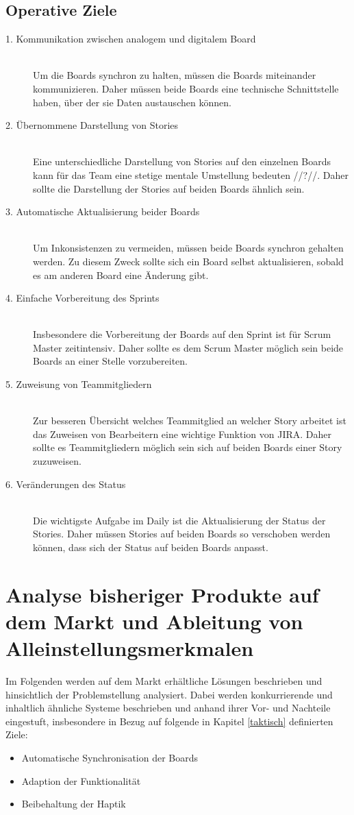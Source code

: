 \documentclass[12pt,titlepage]{scrartcl}
\begin{document}
		\subsection{Operative Ziele} \label{operativeZiele}
		\begin{description}
 			\item[1. Kommunikation zwischen analogem und digitalem Board] \hfill \\
 			Um die Boards synchron zu halten, müssen die Boards miteinander kommunizieren. Daher müssen beide Boards eine technische Schnittstelle haben, über der sie Daten austauschen können. 
 			\item[2. Übernommene Darstellung von Stories] \hfill \\
 			Eine unterschiedliche Darstellung von Stories auf den einzelnen Boards kann für das Team eine stetige mentale Umstellung bedeuten //?//. Daher sollte die Darstellung der Stories auf beiden Boards ähnlich sein.
 			\item[3. Automatische Aktualisierung beider Boards] \hfill \\
 			Um Inkonsistenzen zu vermeiden, müssen beide Boards synchron gehalten werden. Zu diesem Zweck sollte sich ein Board selbst aktualisieren, sobald es am anderen Board eine Änderung gibt.
 			\item[4. Einfache Vorbereitung des Sprints] \hfill \\
 			Insbesondere die Vorbereitung der Boards auf den Sprint ist für Scrum Master zeitintensiv. Daher sollte es dem Scrum Master möglich sein beide Boards an einer Stelle vorzubereiten.
 			\item[5. Zuweisung von Teammitgliedern] \hfill \\
 			Zur besseren Übersicht welches Teammitglied an welcher Story arbeitet ist das Zuweisen von Bearbeitern eine wichtige Funktion von JIRA. Daher sollte es Teammitgliedern möglich sein sich auf beiden Boards einer Story zuzuweisen.
 			\item[6. Veränderungen des Status] \hfill \\
 			Die wichtigste Aufgabe im Daily ist die Aktualisierung der Status der Stories. Daher müssen Stories auf beiden Boards so verschoben werden können, dass sich der Status auf beiden Boards anpasst.
		\end{description}
	\newpage	
	\section{Analyse bisheriger Produkte auf dem Markt und Ableitung von Alleinstellungsmerkmalen} \label{markt}
	Im Folgenden werden auf dem Markt erhältliche Lösungen beschrieben und hinsichtlich der Problemstellung analysiert. Dabei werden konkurrierende und inhaltlich ähnliche Systeme beschrieben und anhand ihrer Vor- und Nachteile eingestuft, insbesondere in Bezug auf folgende in Kapitel \ref{taktisch} definierten Ziele:
	\begin{itemize} 
		\item Automatische Synchronisation der Boards 
		\item Adaption der Funktionalität
		\item Beibehaltung der Haptik 
	\end{itemize}
\end{document}
